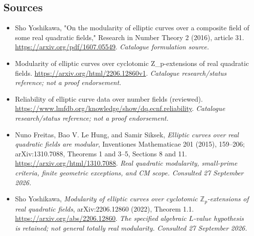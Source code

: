 \documentclass[11pt,a4paper]{article}
\newcommand{\Z}{\mathbb{Z}}
\numberwithin{equation}{section}
\begin{document}
\subsection{Sources}
\begin{itemize}\raggedright
\item[\textnormal{[S1]}]\hypertarget{source:30006706:1}{} Sho Yoshikawa, "On the modularity of elliptic curves over a composite field of some real quadratic fields," Research in Number Theory 2 (2016), article 31.
\url{https://arxiv.org/pdf/1607.05549}.
{\small\textit{Catalogue formulation source.}}
\item[\textnormal{[S2]}]\hypertarget{source:30006706:2}{} Modularity of elliptic curves over cyclotomic Z\_p-extensions of real quadratic fields.
\url{https://arxiv.org/html/2206.12860v1}.
{\small\textit{Catalogue research/status reference; not a proof endorsement.}}
\item[\textnormal{[S3]}]\hypertarget{source:30006706:3}{} Reliability of elliptic curve data over number fields (reviewed).
\url{https://www.lmfdb.org/knowledge/show/dq.ecnf.reliability}.
{\small\textit{Catalogue research/status reference; not a proof endorsement.}}

\item[\textnormal{[E1]}]\hypertarget{extra:30006706:1}{} Nuno Freitas, Bao V. Le Hung, and Samir Siksek, \emph{Elliptic curves over real quadratic fields are modular}, Inventiones Mathematicae 201 (2015), 159--206; arXiv:1310.7088, Theorems 1 and 3--5, Sections 8 and 11.
\url{https://arxiv.org/html/1310.7088}.
{\small\textit{Real quadratic modularity, small-prime criteria, finite geometric exceptions, and CM scope. Consulted 27 September 2026.}}
\item[\textnormal{[E2]}]\hypertarget{extra:30006706:2}{} Sho Yoshikawa, \emph{Modularity of elliptic curves over cyclotomic $\Z_p$-extensions of real quadratic fields}, arXiv:2206.12860 (2022), Theorem 1.1.
\url{https://arxiv.org/abs/2206.12860}.
{\small\textit{The specified algebraic $L$-value hypothesis is retained; not general totally real modularity. Consulted 27 September 2026.}}
\end{itemize}
\end{document}

